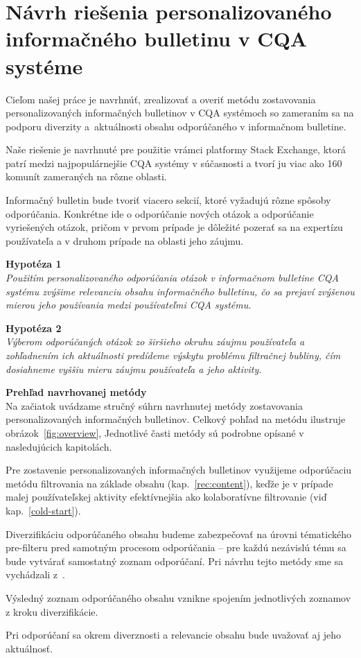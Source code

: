 \newpage
\chapter{Návrh riešenia personalizovaného informačného bulletinu v CQA systéme}

Cieľom našej práce je navrhnúť, zrealizovať a overiť metódu zostavovania personalizovaných informačných bulletinov v CQA systémoch
so zameraním sa na podporu diverzity a~aktuálnosti obsahu odporúčaného v informačnom bulletine.

Naše riešenie je navrhnuté pre použitie vrámci platformy Stack Exchange, ktorá patrí medzi najpopulárnejšie CQA systémy
v súčasnosti a tvorí ju viac ako 160 komunít zameraných na rôzne oblasti.

Informačný bulletin bude tvoriť viacero sekcií, ktoré vyžadujú rôzne spôsoby odporúčania. Konkrétne ide o odporúčanie
nových otázok a odporúčanie vyriešených otázok, pričom v prvom prípade je dôležité pozerať sa na expertízu používateľa
a v druhom prípade na oblasti jeho záujmu.

\textbf{Hypotéza 1}\\
\textit{Použitím personalizovaného odporúčania otázok v informačnom bulletine CQA systému zvýšime relevanciu obsahu informačného
bulletinu, čo sa prejaví zvýšenou mierou jeho používania medzi používateľmi CQA systému.}

\textbf{Hypotéza 2}\\
\textit{Výberom odporúčaných otázok zo širšieho okruhu záujmu používateľa a zohľadnením ich aktuálnosti predídeme výskytu problému
filtračnej bubliny, čím dosiahneme vyššiu mieru záujmu používateľa a jeho aktivity.}

\textbf{Prehľad navrhovanej metódy}\\
Na začiatok uvádzame stručný súhrn navrhnutej metódy zostavovania personalizovaných informačných bulletinov.
Celkový pohľad na metódu ilustruje obrázok~\ref{fig:overview}, Jednotlivé časti metódy sú podrobne opísané v nasledujúcich kapitolách.
\begin{my_itemize}
\item{
    Pre zostavenie personalizovaných informačných bulletinov využijeme odporúčaciu metódu filtrovania na základe obsahu
    (kap.~\ref{rec:content}), keďže je v prípade malej používateľskej aktivity efektívnejšia ako kolaboratívne filtrovanie
    (viď kap.~\ref{cold-start}).
}
\item{
    Diverzifikáciu odporúčaného obsahu budeme zabezpečovať na úrovni tématického pre-filteru pred samotným procesom
    odporúčania -- pre každú nezávislú tému sa bude vytvárať samostatný zoznam odporúčaní.
    Pri návrhu tejto metódy sme sa vychádzali z~\cite{Szpektor2013}.
}
\item{Výsledný zoznam odporúčaného obsahu vznikne spojením jednotlivých zoznamov z kroku diverzifikácie.}
\item{Pri odporúčaní sa okrem diverznosti a relevancie obsahu bude uvažovať aj jeho aktuálnosť.}
\end{my_itemize}

